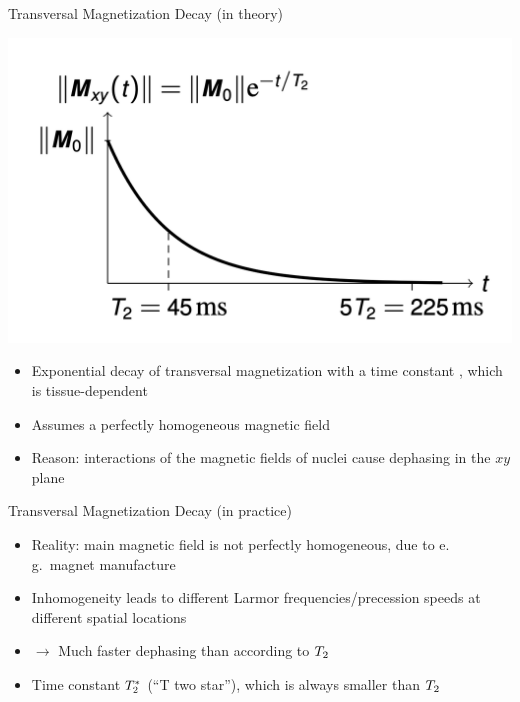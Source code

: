 \begin{frame}{Transversal Magnetization Decay (in theory)}

    \begin{center}
        \includegraphics[height=0.6\textheight]{images/relaxation_transversal}
    \end{center}

    \begin{itemize}
        \item Exponential decay of transversal magnetization with a time constant \transtime{}, which is tissue-dependent
        \item Assumes a perfectly homogeneous magnetic field
        \item Reason: interactions of the magnetic fields of nuclei cause dephasing in the $xy$ plane
    \end{itemize}
\end{frame}

\begin{frame}{Transversal Magnetization Decay (in practice)}

    \begin{itemize}
        \item Reality: main magnetic field  is not perfectly homogeneous, due to e.\,g.~magnet manufacture
        \item Inhomogeneity leads to different Larmor frequencies/precession speeds at different spatial locations
        \item $\rightarrow$ Much faster dephasing than according to $T_2{}$
        \item Time constant $T_2^*{}$ (``T two star''), which is always smaller than $T_2{}$
    \end{itemize}
\end{frame}

